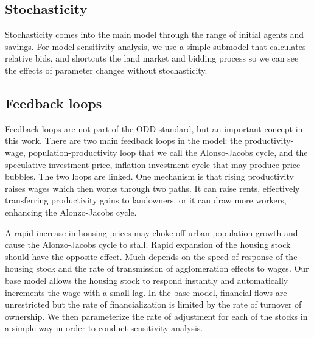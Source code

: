 \subsection{Stochasticity}
Stochasticity comes into the main model through the range of initial agents and savings. For model sensitivity analysis, we use a simple submodel that calculates relative bids, and shortcuts the land market and bidding process so we can see the effects of parameter changes without stochasticity. 

\subsection{Feedback loops}
Feedback loops are not part of the ODD standard, but an important concept in this work. 
There are two main \glspl{feedback loop} in the model: the productivity-wage, population-productivity loop that we call the Alonso-Jacobs cycle, and the speculative investment-price, inflation-investment cycle that may produce price bubbles. 
The two loops are linked. One mechanism is that rising productivity raises wages which then works through two paths. It can raise rents, effectively transferring productivity gains to landowners, or it can draw more workers, enhancing the \Gls{Alonzo-Jacobs cycle}. 

A rapid increase in housing prices may choke off urban population growth and cause the \Gls{Alonzo-Jacobs cycle} to stall. Rapid expansion of the housing stock should have the opposite effect. Much depends on the speed of response of the housing stock and the rate of transmission of agglomeration effects to wages. Our base model allows the housing stock to respond instantly and automatically increments the wage with a small lag. In the base model, financial flows are unrestricted but the rate of financialization is limited by the rate of turnover of ownership. We then parameterize the rate of adjustment for each of the stocks in a simple way in order to conduct sensitivity analysis.

